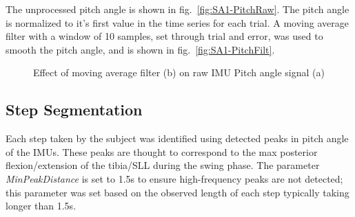 \documentclass[defaultstyle,11pt]{comps}
\begin{document}
The unprocessed pitch angle is shown in fig.~\ref{fig:SA1-PitchRaw}.
The pitch angle is normalized to it's first value in the time series for each trial.
A moving average filter with a window of 10 samples, set through trial and error, was used to smooth the pitch angle, and is shown in fig.~\ref{fig:SA1-PitchFilt}.

\begin{figure}
\centering


\caption{Effect of moving average filter (b) on raw IMU Pitch angle signal (a)}

\label{fig:SA1-Pitch}

\end{figure}

\hypertarget{step-segmentation}{%
\subsection{Step Segmentation}\label{step-segmentation}}

Each step taken by the subject was identified using detected peaks in pitch angle of the IMUs.
These peaks are thought to correspond to the max posterior flexion/extension of the tibia/SLL during the swing phase.
The parameter \emph{MinPeakDistance} is set to 1.5s to ensure high-frequency peaks are not detected; this parameter was set based on the observed length of each step typically taking longer than 1.5s.
\end{document}
